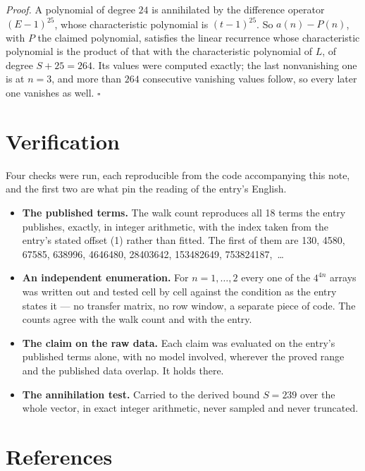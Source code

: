 \documentclass[11pt]{article}
\theoremstyle{definition}
\begin{document}
{\itshape Proof.} A polynomial of degree $24$ is annihilated by the difference operator $(E-1)^{25}$, whose characteristic polynomial is $(t-1)^{25}$. So $a(n) - P(n)$, with $P$ the claimed polynomial, satisfies the linear recurrence whose characteristic polynomial is the product of that with the characteristic polynomial of $L$, of degree $S + 25 = 264$. Its values were computed exactly; the last nonvanishing one is at $n = 3$, and more than $264$ consecutive vanishing values follow, so every later one vanishes as well. $\square$

\section{Verification}

Four checks were run, each reproducible from the code accompanying this note, and the first two are what pin the reading of the entry's English.

\begin{itemize}

\item {\bfseries The published terms.} The walk count reproduces all 18 terms the entry publishes, exactly, in integer arithmetic, with the index taken from the entry's stated offset (1) rather than fitted. The first of them are 130, 4580, 67585, 638996, 4646480, 28403642, 153482649, 753824187,~\dots

\item {\bfseries An independent enumeration.} For $n = 1,\dots,2$ every one of the $4^{4n}$ arrays was written out and tested cell by cell against the condition as the entry states it --- no transfer matrix, no row window, a separate piece of code. The counts agree with the walk count and with the entry.

\item {\bfseries The claim on the raw data.} Each claim was evaluated on the entry's published terms alone, with no model involved, wherever the proved range and the published data overlap. It holds there.

\item {\bfseries The annihilation test.} Carried to the derived bound $S = 239$ over the whole vector, in exact integer arithmetic, never sampled and never truncated.

\end{itemize}

\section{References}
\end{document}
